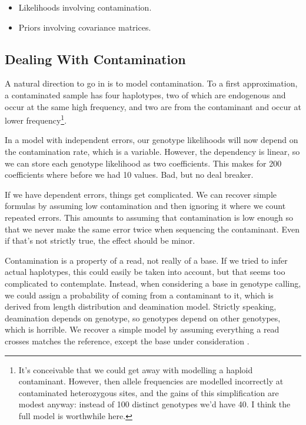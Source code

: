 \documentclass{article}
\begin{document}
\begin{itemize}
\item Likelihoods involving contamination.
\item Priors involving covariance matrices.
\end{itemize}

\subsection{Dealing With Contamination}

A natural direction to go in is to model contamination.  To a first
approximation, a contaminated sample has four haplotypes, two of which
are endogenous and occur at the same high frequency, and two are from
the contaminant and occur at lower frequency\footnote{It's conceivable
that we could get away with modelling a haploid contaminant.  However,
then allele frequencies are modelled incorrectly at contaminated
heterozygous sites, and the gains of this simplification are modest
anyway:  instead of 100 distinct genotypes we'd have 40.  I think the
full model is worthwhile here.}.

In a model with independent errors, our genotype likelihoods will now
depend on the contamination rate, which is a variable.  However, the
dependency is linear, so we can store each genotype
likelihood as two coefficients.  This makes for 200 coefficients where
before we had 10 values.  Bad, but no deal breaker.

If we have dependent errors, things get complicated.  We can recover
simple formulas by assuming low contamination and then ignoring it where
we count repeated errors.  This amounts to assuming that contamination
is low enough so that we never make the same error twice when sequencing
the contaminant.  Even if that's not strictly true, the effect should be
minor.

Contamination is a property of a read, not really of a base.  If we
tried to infer actual haplotypes, this could easily be taken into
account, but that seems too complicated to contemplate.  Instead, when
considering a base in genotype calling, we could assign a probability of
coming from a contaminant to it, which is derived from length
distribution and deamination model.  Strictly speaking, deamination
depends on genotype, so genotypes depend on other genotypes, which is
horrible.  We recover a simple model by assuming everything a read
crosses matches the reference, except the base under consideration
.
\end{document}
